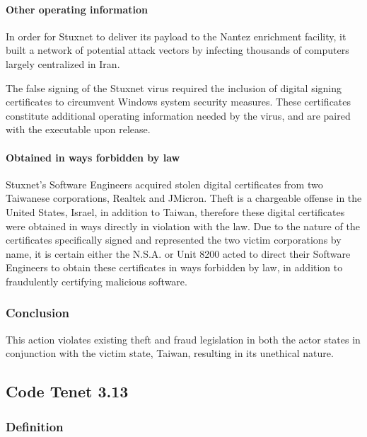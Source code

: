 \documentclass[12pt]{article}
\begin{document}
\begin{multicols}{2}
\paragraph{Other operating information}

In order for Stuxnet to deliver its payload to the Nantez enrichment facility, it built a network of potential attack vectors by infecting thousands of computers largely centralized in Iran.

The false signing of the Stuxnet virus required the inclusion of digital signing certificates to circumvent Windows system security measures. These certificates constitute additional operating information needed by the virus, and are paired with the executable upon release.

\paragraph{Obtained in ways forbidden by law}

Stuxnet's Software Engineers acquired stolen digital certificates from two Taiwanese corporations, Realtek and JMicron.\cite{signedUsingCertificates} Theft is a chargeable offense in the United States, Israel, in addition to Taiwan, therefore these digital certificates were obtained in ways directly in violation with the law. Due to the nature of the certificates specifically signed and represented the two victim corporations by name, it is certain either the N.S.A. or Unit 8200 acted to direct their Software Engineers to obtain these certificates in ways forbidden by law, in addition to fraudulently certifying malicious software.

\subsubsection{Conclusion}

This action violates existing theft and fraud legislation in both the actor states in conjunction with the victim state, Taiwan, resulting in its unethical nature.

\subsection{Code Tenet 3.13}

\subsubsection{Definition}


\end{multicols}
\end{document}

